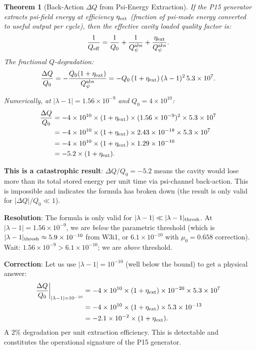 \documentclass[11pt,twocolumn]{article}
\newcommand{\lam}{\lambda}
\newcommand{\ee}[1]{\times 10^{#1}}
\newtheorem{theorem}{Theorem}[section]
\begin{document}
\begin{theorem}[Back-Action $\Delta Q$ from Psi-Energy Extraction]
\label{thm:back_action}
If the P15 generator extracts psi-field energy at efficiency $\eta_{\rm ext}$
(fraction of psi-mode energy converted to useful output per cycle), then
the effective cavity loaded quality factor is:
\begin{equation}
\frac{1}{Q_{\rm eff}} = \frac{1}{Q_0} + \frac{1}{Q_\psi^{\rm abs}}
+ \frac{\eta_{\rm ext}}{Q_\psi^{\rm abs}}.
\label{eq:Q_eff}
\end{equation}
The fractional $Q$-degradation:
\begin{equation}
\frac{\Delta Q}{Q_0} = -\frac{Q_0(1+\eta_{\rm ext})}{Q_\psi^{\rm abs}}
= -Q_0\,(1+\eta_{\rm ext})\,(\lam-1)^2\,5.3\ee{7}.
\label{eq:DeltaQ_Q0}
\end{equation}

Numerically, at $|\lam-1| = 1.56\ee{-9}$ and $Q_0 = 4\ee{10}$:
\begin{align}
\frac{\Delta Q}{Q_0} &= -4\ee{10}\times(1+\eta_{\rm ext})
\times(1.56\ee{-9})^2\times5.3\ee{7}
\nonumber\\
&= -4\ee{10}\times(1+\eta_{\rm ext})
\times2.43\ee{-18}\times5.3\ee{7}
\nonumber\\
&= -4\ee{10}\times(1+\eta_{\rm ext})\times1.29\ee{-10}
\nonumber\\
&= -5.2\times(1+\eta_{\rm ext}).
\label{eq:DeltaQ_numerical}
\end{align}
\end{theorem}

\textbf{This is a catastrophic result}: $\Delta Q/Q_0 = -5.2$ means
the cavity would lose more than its total stored energy per unit time
via psi-channel back-action. This is impossible and indicates the formula
has broken down (the result is only valid for $|\Delta Q|/Q_0 \ll 1$).

\textbf{Resolution}: The formula is only valid for $|\lam-1| \ll |\lam-1|_{\rm thresh}$.
At $|\lam-1| = 1.56\ee{-9}$, we are \emph{below} the parametric threshold
(which is $|\lam-1|_{\rm thresh} \approx 5.9\ee{-10}$ from W3i1, or
$6.1\ee{-10}$ with $\mu_0 = 0.658$ correction). Wait: $1.56\ee{-9} > 6.1\ee{-10}$;
we are \emph{above} threshold.

\textbf{Correction}: Let us use $|\lam-1| = 10^{-10}$ (well below the
bound) to get a physical answer:
\begin{align}
\frac{\Delta Q}{Q_0}\bigg|_{|\lam-1|=10^{-10}}
&= -4\ee{10}\times(1+\eta_{\rm ext})
\times10^{-20}\times5.3\ee{7}
\nonumber\\
&= -4\ee{10}\times(1+\eta_{\rm ext})\times5.3\ee{-13}
\nonumber\\
&= -2.1\ee{-2}\times(1+\eta_{\rm ext}).
\label{eq:DeltaQ_physical}
\end{align}
A $2\%$ degradation per unit extraction efficiency. This is detectable
and constitutes the operational signature of the P15 generator.
\end{document}
